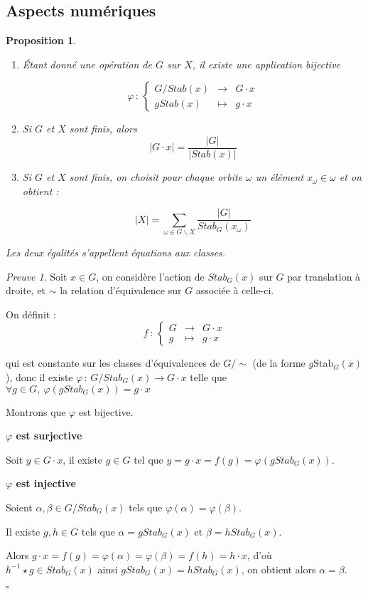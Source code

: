 \documentclass[]{article}
\newtheorem{myproposition}{Proposition}
\theoremstyle{remark}
\newtheorem{myproof}{Preuve}
\theoremstyle{definition}
\newcommand{\cqfd}{
	\hfill$\square$
}
\newcommand{\func}[5]{
#1 \, : \, \left\{ \begin{array}{lcl}
	#2 & \longrightarrow & #3 \\
	#4 & \longmapsto & #5
\end{array}
\right.
}
\newcommand{\funcshort}[3]{
#1 \, : \, #2 \longrightarrow #3
}
\newenvironment{proofpart}[1]{
	\noindent
	{\textbf{\boldmath #1}}
}{
	\checkmark
}
\begin{document}
\subsection{Aspects numériques}

\begin{myproposition}
	\leavevmode
	\begin{enumerate}
		\item Étant donné une opération de $G$ sur $X$, il existe une application bijective
		
		$$\func{\varphi}{G/Stab(x)}{G \cdot x}{g Stab(x)}{g \cdot x}$$
		
		\item Si $G$ et $X$ sont finis, alors $$|G \cdot x| = \frac{|G|}{|Stab(x)|}$$
		
		\item Si $G$ et $X$ sont finis, on choisit pour chaque orbite $\omega$ un élément $x_\omega \in \omega$ et on obtient :
		
		$$|X| = \sum_{\omega \in G \backslash X} \frac{|G|}{Stab_G(x_\omega)}$$
	\end{enumerate}
	
	Les deux égalités s'appellent \textit{équations aux classes}.
\end{myproposition}

\begin{myproof}
	Soit $x \in G$, on considère l'action de $Stab_G(x)$ sur $G$ par translation à droite, et $\sim$ la relation d'équivalence sur $G$ associée à celle-ci.
	
	On définit : $$\func{f}{G}{G \cdot x}{g}{g \cdot x}$$
	
	qui est constante sur les classes d'équivalences de $G/\sim$ (de la forme $g\text{Stab}_G(x)$), donc il existe $\funcshort{\varphi}{G/Stab_G(x)}{G \cdot x}$ telle que $\forall g \in G, ~ \varphi(gStab_G(x))=g \cdot x$
	
	Montrons que $\varphi$ est bijective.
	
	\begin{proofpart}{$\varphi$ est surjective}
	
		Soit $y \in G \cdot x$, il existe $g \in G$ tel que $y = g \cdot x = f(g) = \varphi(g Stab_G(x))$.
	\end{proofpart}
	
	\begin{proofpart}{$\varphi$ est injective}
	
		Soient $\alpha, \beta \in G/Stab_G(x)$ tels que $\varphi(\alpha) = \varphi(\beta)$.
		
		Il existe $g, h \in G$ tels que $\alpha = g Stab_G(x)$ et $\beta = h Stab_G(x)$.
		
		Alors $g \cdot x=f(g)=\varphi(\alpha)=\varphi(\beta)=f(h)=h \cdot x$, d'où $h^{-1} \star g \in Stab_G(x)$ ainsi $gStab_G(x)=hStab_G(x)$, on obtient alors $\alpha = \beta$.
	\end{proofpart}
	
	\cqfd
\end{myproof}
\end{document}
